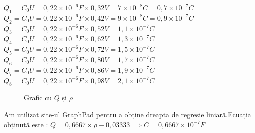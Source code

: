 \documentclass[12pt]{article}
\begin{document}
$Q_{1} = C_{0}U=0,22 \times 10^{-6}F \times 0,32V = 7 \times 10^{-8}C = 0,7 \times 10^{-7}C $\\
$Q_{2} = C_{0}U=0,22 \times 10^{-6}F \times 0,42V = 9 \times 10^{-8}C = 0,9 \times 10^{-7}C $\\
$Q_{3} = C_{0}U=0,22 \times 10^{-6}F \times 0,52V = 1,1 \times 10^{-7}C$\\
$Q_{4} = C_{0}U=0,22 \times 10^{-6}F \times 0,62V = 1,3 \times 10^{-7}C$\\
$Q_{5} = C_{0}U=0,22 \times 10^{-6}F \times 0,72V = 1,5 \times 10^{-7}C$\\
$Q_{6} = C_{0}U=0,22 \times 10^{-6}F \times 0,80V = 1,7 \times 10^{-7}C$\\
$Q_{7} = C_{0}U=0,22 \times 10^{-6}F \times 0,86V = 1,9 \times 10^{-7}C$\\
$Q_{8} = C_{0}U=0,22 \times 10^{-6}F \times 0,98V = 2,1 \times 10^{-7}C$\\

\begin{figure}[H]
    \centering
    \caption{Grafic cu $Q$ și $\rho$}
    \label{fig:Q_vs_rho}
\end{figure}

Am utilizat site-ul \href{https://www.graphpad.com}{GraphPad} pentru a obține dreapta de regresie liniară.Ecuația obținută este : $Q=0,6667 \times \rho-0,03333 \implies C=0,6667 \times 10^{-7}F$\\
\end{document}
